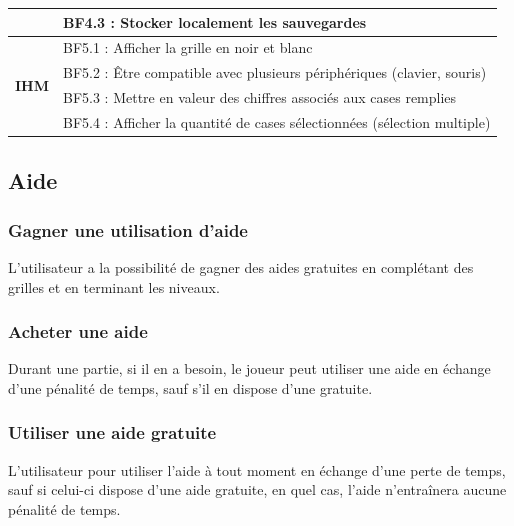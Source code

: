 \documentclass{report}
\begin{document}
\begin{table}[H]
\begin{tabular}{@{}cl@{}}
\multicolumn{1}{|c|}{}                                      & \multicolumn{1}{l|}{BF4.3 : Stocker localement les sauvegardes}                               \\ \midrule
\multicolumn{1}{|c|}{\multirow{4}{*}{\textbf{IHM}}}         & \multicolumn{1}{l|}{BF5.1 : Afficher la grille en noir et blanc}                              \\ \cmidrule(l){2-2} 
\multicolumn{1}{|c|}{}                                      & \multicolumn{1}{l|}{BF5.2 : Être compatible avec plusieurs périphériques (clavier, souris)}   \\ \cmidrule(l){2-2} 
\multicolumn{1}{|c|}{}                                      & \multicolumn{1}{l|}{BF5.3 : Mettre en valeur des chiffres associés aux cases remplies}        \\ \cmidrule(l){2-2} 
\multicolumn{1}{|c|}{}                                      & \multicolumn{1}{l|}{BF5.4 : Afficher la quantité de cases sélectionnées (sélection multiple)} \\ \bottomrule
\end{tabular}
\end{table}    
    
 \setcounter{secnumdepth}{5}
 
 	\subsection{Aide}
 	    \subsubsection{Gagner une utilisation d'aide}
 	            L'utilisateur a la possibilité de gagner des aides gratuites en complétant des grilles et en terminant les niveaux.
 		\subsubsection{Acheter une aide}
 			    Durant une partie, si il en a besoin, le joueur peut utiliser une aide en échange d'une pénalité de temps, sauf s'il en dispose d'une gratuite.
		\subsubsection{Utiliser une aide gratuite}
				L'utilisateur pour utiliser l'aide à tout moment en échange d'une perte de temps, sauf si celui-ci dispose d'une aide gratuite, en quel cas, l'aide n'entraînera aucune pénalité de temps.
\end{document}
